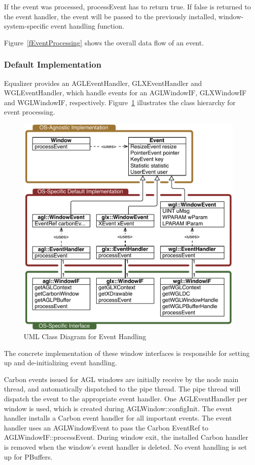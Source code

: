 \documentclass[10pt,a4]{scrartcl}
\newcommand{\fig}[1]{Figure~\ref{#1}}
\begin{document}
If the event was processed, \textsf{processEvent} has to return
\textsf{true}. If \textsf{false} is returned to the event handler, the
event will be passed to the previously installed, window-system-specific
event handling function.

\fig{fEventProcessing} shows the overall data flow of an event.

\subsubsection{Default Implementation}

Equalizer provides an \textsf{AGLEvent\-Handler},
\textsf{GLXEventHandler} and \textsf{WGL\-Event\-Handler}, which handle
events for an \textsf{AGLWindowIF}, \textsf{GLXWindowIF} and
\textsf{WGL\-Win\-dowIF}, respectively. \fig{fEventUML} illustrates the
class hierarchy for event processing.

\begin{figure}
  \includegraphics[width=.618\textwidth]{images/eventUML.pdf}
  {\caption{\label{fEventUML}UML Class Diagram for Event Handling}}
\end{figure}
The concrete implementation of these window interfaces is responsible
for setting up and de-initializing event handling.

Carbon events issued for AGL windows are initially receive by the node
main thread, and automatically dispatched to the pipe thread. The pipe
thread will dispatch the event to the appropriate event handler. One
\textsf{AGLEventHandler} per window is used, which is created during
\textsf{AGLWindow::configInit}. The event handler installs a Carbon
event handler for all important events. The event handler uses an
\textsf{AGLWindowEvent} to pass the Carbon \textsf{EventRef} to
\textsf{AGLWindowIF::processEvent}. During window exit, the installed
Carbon handler is removed when the window's event handler is deleted. No
event handling is set up for PBuffers.
\end{document}
